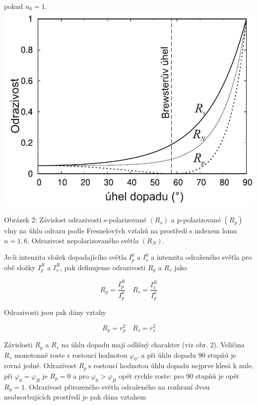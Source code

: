 \documentclass[czech,11pt,a4paper]{article}
\begin{document}
\begin{multicols}{2}
		
		pokud $n_{0}=1$.\\
		 \includegraphics[max width=0.95\linewidth, center]{2024_11_19_160a1389244899f42734g-2}
		
		Obrázek 2: Závislost odrazivosti s-polarizované $\left(R_{s}\right)$ a p-polarizované $\left(R_{p}\right)$ vlny na úhlu odrazu podle Fresnelových vztahů na prostředí s indexem lomu $n=1,6$. Odrazivost nepolarizovaného světla $\left(R_{N}\right)$.
		
		Je-li intenzita složek dopadajícího světla $I_{p}^{0}$ a $I_{s}^{0}$ a intenzita odraženého světla pro obě složky $I_{p}^{R}$ a $I_{s}^{R}$, pak definujeme odrazivosti $R_{p}$ a $R_{s}$ jako
		
		
		\begin{equation}
			R_{p}=\frac{I_{p}^{R}}{I_{p}^{0}} \quad R_{s}=\frac{I_{s}^{R}}{I_{p}^{0}}
		\end{equation}
		
		Odrazivosti jsou pak dány vztahy
		
\begin{equation}
			R_{p}=r_{p}^{2} \quad R_{s}=r_{s}^{2}
\end{equation}
		
		
		Závislosti $R_{p}$ a $R_{s}$ na úhlu dopadu mají odlišný charakter (viz obr. 2). Veličina $R_{s}$ monotonně roste s rostoucí hodnotou $\varphi_{0}$, a při úhlu dopadu 90 stupňǔ je rovná jedné. Odrazivost $R_{p} \mathrm{~s}$ rostoucí hodnotou úhlu dopadu nejprve klesá k nule, při $\varphi_{0}=\varphi_{B}$ je $R_{p}=0$ a pro $\varphi_{0}>\varphi_{B}$ opĕt rychle roste: pro 90 stupňú je opět $R_{p}=1$. Odrazivost přirozeného světla odraženého na rozhraní dvou neabsorbujících prostředí je pak dána vztahem
		

\end{multicols}
\end{document}
